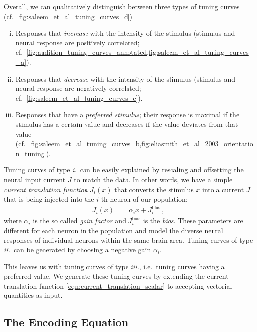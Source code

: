 \documentclass[10pt,letterpaper,oneside]{article}
\begin{document}
Overall, we can qualitatively distinguish between three types of tuning curves (cf.~\cref{fig:saleem_et_al_tuning_curves_d})
\begin{enumerate}[i.]
	\item Responses that \emph{increase} with the intensity of the stimulus (stimulus and neural response are positively correlated; cf.~\cref{fig:audition_tuning_curves_annotated,fig:saleem_et_al_tuning_curves_a}).
	\item Responses that \emph{decrease} with the intensity of the stimulus (stimulus and neural response are negatively correlated; cf.~\cref{fig:saleem_et_al_tuning_curves_c}).
	\item Responses that have a \emph{preferred stimulus}; their response is maximal if the stimulus has a certain value and decreases if the value deviates from that value (cf.~\cref{fig:saleem_et_al_tuning_curves_b,fig:eliasmith_et_al_2003_orientation_tuning}).
\end{enumerate}

Tuning curves of type \emph{i.}~can be easily explained by rescaling and offsetting the neural input current $J$ to match the data. In other words, we have a simple \emph{current translation function} $J_i(x)$ that converts the stimulus $x$ into a current $J$ that is being injected into the $i$-th neuron of our population:
\begin{align}
	J_i(x) &= \alpha_i x + J^\mathrm{bias}_i \,,
	\label{eqn:current_translation_scalar}
\end{align}
where $\alpha_i$ is the so called \emph{gain factor} and $J^\mathrm{bias}_i$ is the \emph{bias}. These parameters are different for each neuron in the population and model the diverse neural responses of individual neurons within the same brain area. Tuning curves of type \emph{ii.}~can be generated by choosing a negative gain $\alpha_i$.


This leaves us with tuning curves of type \emph{iii.}, i.e.~tuning curves having a preferred value. We generate these tuning curves by extending the current translation function \cref{eqn:current_translation_scalar} to accepting vectorial quantities as input.

\subsection{The Encoding Equation}
\end{document}
